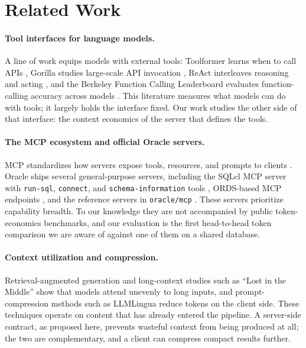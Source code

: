 \section{Related Work}\label{sec:related-work}

\paragraph{Tool interfaces for language models.}
A line of work equips models with external tools: Toolformer learns when to call APIs \cite{toolformer2023}, Gorilla studies large-scale API invocation \cite{gorilla2023}, ReAct interleaves reasoning and acting \cite{react2023}, and the Berkeley Function Calling Leaderboard evaluates function-calling accuracy across models \cite{bfcl2024}. This literature measures what models can do with tools; it largely holds the interface fixed. Our work studies the other side of that interface: the context economics of the server that defines the tools.

\paragraph{The MCP ecosystem and official Oracle servers.}
MCP standardizes how servers expose tools, resources, and prompts to clients \cite{anthropicmcp2024, mcpspec2025}. Oracle ships several general-purpose servers, including the SQLcl MCP server with \texttt{run-sql}, \texttt{connect}, and \texttt{schema-information} tools \cite{sqlclmcp2026}, ORDS-based MCP endpoints \cite{ordsmcp2026}, and the reference servers in \texttt{oracle/mcp} \cite{oraclemcp2026}. These servers prioritize capability breadth. To our knowledge they are not accompanied by public token-economics benchmarks, and our evaluation is the first head-to-head token comparison we are aware of against one of them on a shared database.

\paragraph{Context utilization and compression.}
Retrieval-augmented generation \cite{rag2020} and long-context studies such as ``Lost in the Middle'' \cite{lostinthemiddle2023} show that models attend unevenly to long inputs, and prompt-compression methods such as LLMLingua \cite{llmlingua2023} reduce tokens on the client side. These techniques operate on content that has already entered the pipeline. A server-side contract, as proposed here, prevents wasteful context from being produced at all; the two are complementary, and a client can compress compact results further.

